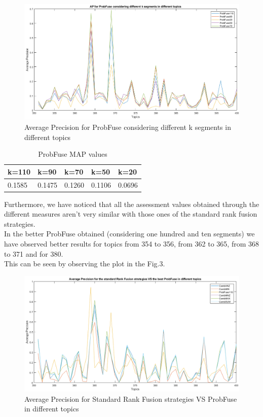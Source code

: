 \documentclass[12pt,journal]{IEEEtran}
\begin{document}
\begin{figure}
\includegraphics[scale=0.6]{plot4}
\caption{Average Precision for ProbFuse considering different k segments in different topics}
\label{Average Precision for ProbFuse considering different k segments in different topics}
\end{figure}

\begin{table}[h!]
\centering
\caption{ProbFuse MAP values}
\begin{tabular}{|l|l|l|l|l|}
\hline
k=110 & k=90 & k=70 & k=50 & k=20\\ \hline
 0.1585 & 0.1475 & 0.1260 & 0.1106  & 0.0696\\ \hline
\end{tabular}
\end{table}

Furthermore, we have noticed that all the assessment values obtained through the different measures aren’t very similar with those ones of the standard rank fusion strategies. \\
In the better ProbFuse obtained (considering one hundred and ten segments) we have observed better results for topics from 354 to 356, from 362 to 365, from 368 to 371 and for 380. \\ This can be seen by observing the plot in the Fig.3.

\begin{figure}
\includegraphics[scale=0.6]{plot2}
\caption{Average Precision for Standard Rank Fusion strategies VS ProbFuse in different topics}
\label{Average Precision for Standard Rank Fusion strategies VS ProbFuse in different topics}
\end{figure}
\end{document}
